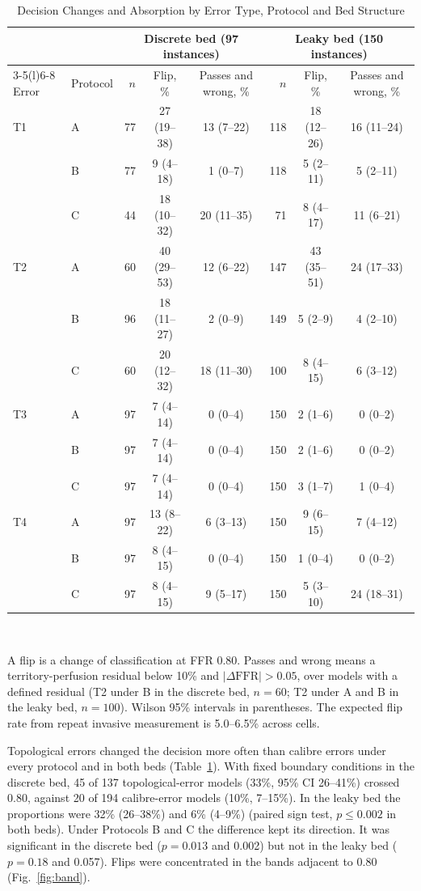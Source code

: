 \documentclass[journal]{IEEEtran}
\begin{document}
\begin{table}[!t]
\caption{Decision Changes and Absorption by Error Type, Protocol and Bed Structure}
\label{tab:results}
\centering\footnotesize
\begin{tabular}{@{}llrccrcc@{}}
\toprule
 & & \multicolumn{3}{c}{Discrete bed (97 instances)} & \multicolumn{3}{c}{Leaky bed (150 instances)}\\
\cmidrule(lr){3-5}\cmidrule(l){6-8}
Error & Protocol & $n$ & Flip, \% & Passes and wrong, \% & $n$ & Flip, \% & Passes and wrong, \%\\
\midrule
T1 & A & 77 & 27 (19--38) & 13 (7--22) & 118 & 18 (12--26) & 16 (11--24) \\
 & B & 77 & 9 (4--18) & 1 (0--7) & 118 & 5 (2--11) & 5 (2--11) \\
 & C & 44 & 18 (10--32) & 20 (11--35) & 71 & 8 (4--17) & 11 (6--21) \\
\addlinespace[2pt]
T2 & A & 60 & 40 (29--53) & 12 (6--22) & 147 & 43 (35--51) & 24 (17--33) \\
 & B & 96 & 18 (11--27) & 2 (0--9) & 149 & 5 (2--9) & 4 (2--10) \\
 & C & 60 & 20 (12--32) & 18 (11--30) & 100 & 8 (4--15) & 6 (3--12) \\
\addlinespace[2pt]
T3 & A & 97 & 7 (4--14) & 0 (0--4) & 150 & 2 (1--6) & 0 (0--2) \\
 & B & 97 & 7 (4--14) & 0 (0--4) & 150 & 2 (1--6) & 0 (0--2) \\
 & C & 97 & 7 (4--14) & 0 (0--4) & 150 & 3 (1--7) & 1 (0--4) \\
\addlinespace[2pt]
T4 & A & 97 & 13 (8--22) & 6 (3--13) & 150 & 9 (6--15) & 7 (4--12) \\
 & B & 97 & 8 (4--15) & 0 (0--4) & 150 & 1 (0--4) & 0 (0--2) \\
 & C & 97 & 8 (4--15) & 9 (5--17) & 150 & 5 (3--10) & 24 (18--31) \\
\bottomrule
\end{tabular}
\\[2pt]
\parbox{\textwidth}{\footnotesize A flip is a change of classification at FFR 0.80. Passes and wrong means a territory-perfusion residual below 10\% and $|\Delta\mathrm{FFR}| > 0.05$, over models with a defined residual (T2 under B in the discrete
bed, $n = 60$; T2 under A and B in the leaky bed, $n = 100$). Wilson 95\% intervals in parentheses. The expected flip
rate from repeat invasive measurement is 5.0--6.5\% across cells.}
\end{table}

Topological errors changed the decision more often than calibre errors under every protocol and in both beds
(Table~\ref{tab:results}). With fixed boundary conditions in the discrete bed, 45 of 137 topological-error models
(33\%, 95\% CI 26--41\%) crossed 0.80, against 20 of 194 calibre-error models (10\%, 7--15\%). In the leaky bed the
proportions were 32\% (26--38\%) and 6\% (4--9\%) (paired sign test, $p \leq 0.002$ in both beds). Under
Protocols B and C the difference kept its direction. It was significant in the discrete bed
($p = 0.013$ and 0.002) but not in the leaky bed ($p = 0.18$ and 0.057). Flips were concentrated in the bands
adjacent to 0.80 (Fig.~\ref{fig:band}).
\end{document}
